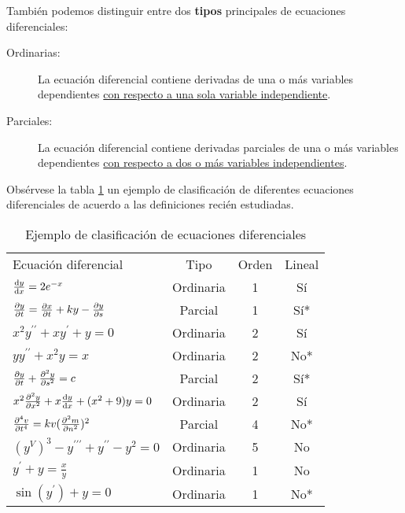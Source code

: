 \documentclass[12pt]{article} %
\theoremstyle{remark} %
\begin{document}
También podemos distinguir entre dos \textbf{tipos} principales de ecuaciones diferenciales:
\begin{description}
  \item[Ordinarias:] La ecuación diferencial contiene derivadas de una o más variables dependientes 
    \underline{con respecto a una sola variable independiente}.
  \item[Parciales:] La ecuación diferencial contiene derivadas parciales de una o más variables dependientes
    \underline{con respecto a dos o más variables independientes}.
\end{description}

Obsérvese la tabla \ref{tab:EjemploClasificacion} un ejemplo de clasificación de diferentes ecuaciones diferenciales de acuerdo a las definiciones 
recién estudiadas.

\begin{table}
  \centering
  \caption{Ejemplo de clasificación de ecuaciones diferenciales}
  \label{tab:EjemploClasificacion}
  \begin{tabular}{lccc}
    Ecuación diferencial & Tipo & Orden & Lineal \\[0.5em]
    $\dv{y}{x} = 2e^{-x}$ & Ordinaria & 1 & Sí \\[0.6em]
    $\pdv{y}{t} = \pdv{x}{t} + ky - \pdv{y}{s}$ & Parcial & 1 & Sí* \\[0.6em]
    $x^2y^{\prime \prime} + xy^{\prime} + y = 0$ & Ordinaria & 2 & Sí \\[0.6em]
    $yy^{\prime \prime} + x^2y = x$ & Ordinaria & 2 & No* \\[0.6em]
    $\pdv{y}{t} + \pdv[2]{y}{s} = c$ &Parcial & 2 & Sí* \\[0.6em]
    $x^2 \pdv[2]{y}{x} + x \dv{y}{x} + (x^2 + 9)y = 0$ & Ordinaria & 2 & Sí \\[0.6em]
    $\pdv[4]{v}{t} = kv(\pdv[2]{m}{n})^2$ & Parcial & 4 & No* \\[0.6em]
    $(y^V)^3 - y^{\prime \prime \prime} + y^{\prime \prime} - y^2 = 0$ & Ordinaria & 5 & No \\[0.6em]
    $y^{\prime} + y = \frac{x}{y}$ & Ordinaria & 1 & No \\[0.6em]
    $\sin (y^{\prime}) + y = 0$ & Ordinaria & 1 & No*
  \end{tabular}
\end{table}
\end{document}
